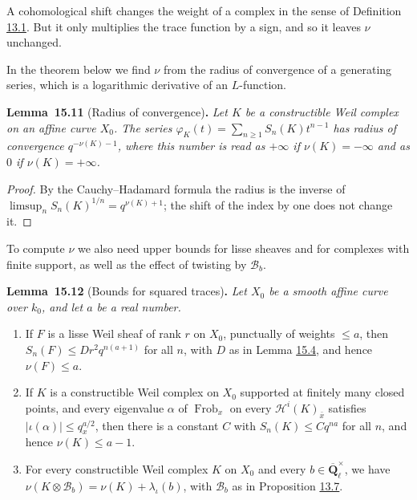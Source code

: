 \documentclass[11pt]{article}
\newenvironment{bpstatement}[2]{\par\addvspace{0.6\baselineskip}\noindent\textbf{#1}#2\textbf{.}\enspace\ignorespaces}
  {\par\addvspace{0.4\baselineskip}}
\newenvironment{bpstatementit}[2]{\begin{bpstatement}{#1}{#2}\itshape\ignorespaces}{\end{bpstatement}}
\begin{document}
\label{bp152}%
A cohomological shift changes the weight of a complex in the sense of Definition \hyperref[bp9]{13.1}. But it only multiplies the trace function by a sign, and so it leaves \(\nu\) unchanged.

In the theorem below we find \(\nu\) from the radius of convergence of a generating series, which is a logarithmic derivative of an \(L\)-function.

\label{bp153}%
\begin{bpstatementit}{Lemma~15.11}{ (Radius of convergence)}
Let \(K\) be a constructible Weil complex on an affine curve \(X_0\). The series \(\varphi_K(t)=\sum_{n\ge1}S_n(K)t^{n-1}\) has radius of convergence \(q^{-\nu(K)-1}\), where this number is read as \(+\infty\) if \(\nu(K)=-\infty\) and as \(0\) if \(\nu(K)=+\infty\).
\end{bpstatementit}

\begin{proof}[{Proof}]\label{bp154}%
By the Cauchy–Hadamard formula the radius is the inverse of \(\limsup_nS_n(K)^{1/n}=q^{\nu(K)+1}\); the shift of the index by one does not change it.
\end{proof}

\label{bp155}%
To compute \(\nu\) we also need upper bounds for lisse sheaves and for complexes with finite support, as well as the effect of twisting by \(\mathcal B_b\).

\label{bp156}%
\begin{bpstatementit}{Lemma~15.12}{ (Bounds for squared traces)}
Let \(X_0\) be a smooth affine curve over \(k_0\), and let \(a\) be a real number.

\begin{enumerate}
\item If \(F\) is a lisse Weil sheaf of rank \(r\) on \(X_0\), punctually of weights \(\le a\), then \(S_n(F)\le Dr^2q^{n(a+1)}\) for all \(n\), with \(D\) as in Lemma \hyperref[bp131]{15.4}, and hence \(\nu(F)\le a\).
\item If \(K\) is a constructible Weil complex on \(X_0\) supported at finitely many closed points, and every eigenvalue \(\alpha\) of \(\operatorname{Frob}_x\) on every \(\mathcal H^i(K)_{\bar x}\) satisfies \(|\iota(\alpha)|\le q_x^{a/2}\), then there is a constant \(C\) with \(S_n(K)\le Cq^{na}\) for all \(n\), and hence \(\nu(K)\le a-1\).
\item For every constructible Weil complex \(K\) on \(X_0\) and every \(b\in\overline{\mathbf Q}_\ell^\times\), we have \(\nu(K\otimes\mathcal B_b)=\nu(K)+\lambda_\iota(b)\), with \(\mathcal B_b\) as in Proposition \hyperref[bp24]{13.7}.
\end{enumerate}
\end{bpstatementit}
\end{document}
